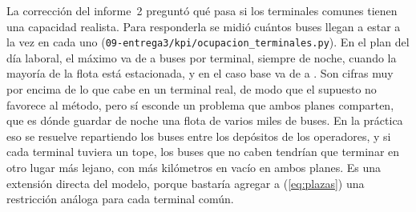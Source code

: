 La corrección del informe~2 preguntó qué pasa si los terminales comunes tienen una capacidad realista. Para responderla se midió cuántos buses llegan a estar a la vez en cada uno (\texttt{09-entrega3/kpi/ocupacion\_terminales.py}). En el plan del día laboral, el máximo va de \TerminalMinPlan{} a \TerminalMaxPlan{} buses por terminal, siempre de noche, cuando la mayoría de la flota está estacionada, y en el caso base va de \TerminalMinBase{} a \TerminalMaxBase. Son cifras muy por encima de lo que cabe en un terminal real, de modo que el supuesto no favorece al método, pero sí esconde un problema que ambos planes comparten, que es dónde guardar de noche una flota de varios miles de buses. En la práctica eso se resuelve repartiendo los buses entre los depósitos de los operadores, y si cada terminal tuviera un tope, los buses que no caben tendrían que terminar en otro lugar más lejano, con más kilómetros en vacío en ambos planes. Es una extensión directa del modelo, porque bastaría agregar a (\ref{eq:plazas}) una restricción análoga para cada terminal común.
